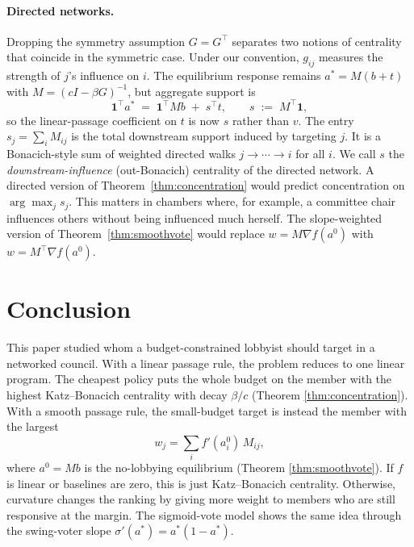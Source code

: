 \documentclass[11pt,letterpaper]{article}
\theoremstyle{plain}
\theoremstyle{definition}
\theoremstyle{remark}
\begin{document}
\paragraph{Directed networks.} Dropping the symmetry assumption $G = G^\top$ separates two notions of centrality that coincide in the symmetric case. Under our convention, $g_{ij}$ measures the strength of $j$'s influence on $i$. The equilibrium response remains $a^* = M(b + t)$ with $M = (cI - \beta G)^{-1}$, but aggregate support is
\[
\mathbf{1}^\top a^* \;=\; \mathbf{1}^\top M b \;+\; s^\top t, \qquad s \;:=\; M^\top \mathbf{1},
\]
so the linear-passage coefficient on $t$ is now $s$ rather than $v$. The entry $s_j = \sum_i M_{ij}$ is the total downstream support induced by targeting $j$. It is a Bonacich-style sum of weighted directed walks $j \to \cdots \to i$ for all $i$. We call $s$ the \emph{downstream-influence} (out-Bonacich) centrality of the directed network. A directed version of Theorem~\ref{thm:concentration} would predict concentration on $\arg\max_j s_j$. This matters in chambers where, for example, a committee chair influences others without being influenced much herself. The slope-weighted version of Theorem~\ref{thm:smoothvote} would replace $w = M \nabla f(a^0)$ with $w = M^\top \nabla f(a^0)$.


\section{Conclusion}
\label{sec:conclusion}

This paper studied whom a budget-constrained lobbyist should target in a networked council. With a linear passage rule, the problem reduces to one linear program. The cheapest policy puts the whole budget on the member with the highest Katz--Bonacich centrality with decay $\beta/c$ (Theorem \ref{thm:concentration}). With a smooth passage rule, the small-budget target is instead the member with the largest
\[
w_j = \sum_i f'(a_i^0)\, M_{ij},
\]
where $a^0 = Mb$ is the no-lobbying equilibrium (Theorem \ref{thm:smoothvote}). If $f$ is linear or baselines are zero, this is just Katz--Bonacich centrality. Otherwise, curvature changes the ranking by giving more weight to members who are still responsive at the margin. The sigmoid-vote model shows the same idea through the swing-voter slope $\sigma'(a^*) = a^*(1 - a^*)$.
\end{document}
